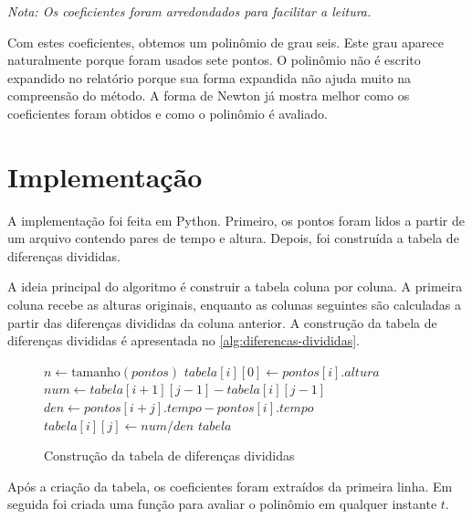 \documentclass[12pt,brazil,a4paper, twocolumn]{article}
\begin{document}
\begin{center}
{\small\textit{Nota: Os coeficientes foram arredondados para facilitar a leitura.}}
\end{center}

Com estes coeficientes, obtemos um polinômio de grau seis. Este grau aparece naturalmente porque foram usados sete pontos. O polinômio não é escrito expandido no relatório porque sua forma expandida não ajuda muito na compreensão do método. A forma de Newton já mostra melhor como os coeficientes foram obtidos e como o polinômio é avaliado.

\section{Implementação}

A implementação foi feita em Python. Primeiro, os pontos foram lidos a partir de um arquivo contendo pares de tempo e altura. Depois, foi construída a tabela de diferenças divididas.

A ideia principal do algoritmo é construir a tabela coluna por coluna. A primeira coluna recebe as alturas originais, enquanto as colunas seguintes são calculadas a partir das diferenças divididas da coluna anterior. A construção da tabela de diferenças divididas é apresentada no \autoref{alg:diferencas-divididas}.

\begin{figure}[t]
\centering
\begin{minipage}{0.75\textwidth}
\begin{algorithm}[H]
\caption{Construção da tabela de diferenças divididas}
\label{alg:diferencas-divididas}
\begin{algorithmic}[]
\State $n \gets \text{tamanho}(pontos)$
    \State $tabela[i][0] \gets pontos[i].altura$
\EndFor
{}
        \State $num \gets tabela[i+1][j-1]-tabela[i][j-1]$
        \State $den \gets pontos[i+j].tempo-pontos[i].tempo$
        \State $tabela[i][j] \gets num/den$
    \EndFor
\EndFor
\State \Return $tabela$
\end{algorithmic}
\end{algorithm}
\end{minipage}
\end{figure}

Após a criação da tabela, os coeficientes foram extraídos da primeira linha. Em seguida foi criada uma função para avaliar o polinômio em qualquer instante $t$.
\end{document}

